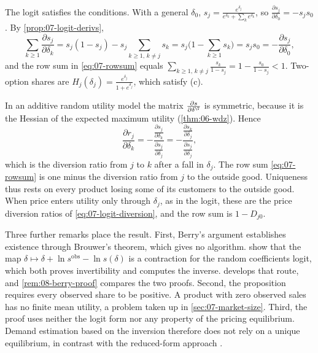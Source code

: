 The logit satisfies the conditions. With a general $\delta_0$, $s_j = \frac{e^{\delta_j}}{e^{\delta_0} +
\sum_k e^{\delta_k}}$, so $\frac{\partial s_j}{\partial \delta_0} = -s_j s_0$. By \cref{prop:07-logit-derivs},
\begin{equation*}
  \sum_{k \ge 1}\frac{\partial s_j}{\partial \delta_k} = s_j(1 - s_j) - s_j\sum_{k \ge 1,\, k \ne j}s_k
  = s_j\Big(1 - \sum_{k \ge 1}s_k\Big) = s_j s_0 = -\frac{\partial s_j}{\partial \delta_0},
\end{equation*}
and the row sum in \eqref{eq:07-rowsum} equals $\sum_{k \ge 1,\, k \ne j}\frac{s_k}{1 - s_j} = 1 -
\frac{s_0}{1 - s_j} < 1$. Two-option shares are $H_j(\delta_j) = \frac{e^{\delta_j}}{1 + e^{\delta_j}}$, which satisfy (c).

\begin{remark}\label{rem:07-diversion-uniqueness}
In an additive random utility model the matrix $\frac{\partial s}{\partial \delta^\T}$ is symmetric, because it
is the Hessian of the expected maximum utility (\cref{thm:06-wdz}). Hence
\begin{equation*}
  \frac{\partial r_j}{\partial \delta_k}
  = -\frac{\frac{\partial s_j}{\partial \delta_k}}{\frac{\partial s_j}{\partial \delta_j}}
  = -\frac{\frac{\partial s_k}{\partial \delta_j}}{\frac{\partial s_j}{\partial \delta_j}},
\end{equation*}
which is the diversion ratio from $j$ to $k$ after a fall in $\delta_j$. The row sum \eqref{eq:07-rowsum} is one minus the
diversion ratio from $j$ to the outside good. Uniqueness thus rests on every product losing some of its
customers to the outside good. When price enters utility only through $\delta_j$, as in the logit, these are
the price diversion ratios of \eqref{eq:07-logit-diversion}, and the row sum is $1 - D_{j0}$.
\end{remark}

Three further remarks place the result. First, Berry's argument establishes existence through Brouwer's
theorem, which gives no algorithm. \citet[Appendix~I]{BerryLevinsohnPakes1995} show that the map $\delta \mapsto
\delta + \ln s^{\mathrm{obs}} - \ln s(\delta)$ is a contraction for the random coefficients logit, which both
proves invertibility and computes the inverse.  develops that route, and
\cref{rem:08-berry-proof} compares the two proofs. Second, the proposition requires every observed share to be
positive. A product with zero observed sales has no finite mean utility, a problem taken up in
\cref{sec:07-market-size}. Third, the proof uses neither the logit form nor any property of the pricing
equilibrium. Demand estimation based on the inversion therefore does not rely on a unique equilibrium, in
contrast with the reduced-form approach \citep[p.~243]{Berry1994}.

